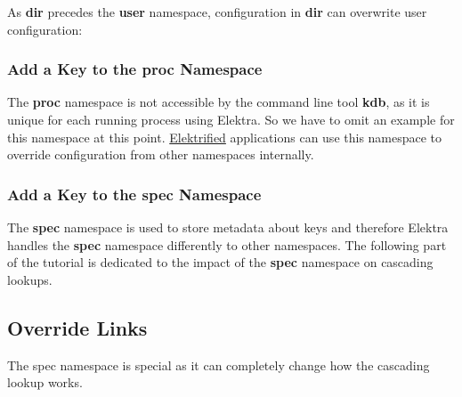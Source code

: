As {\bfseries dir} precedes the {\bfseries user} namespace, configuration in {\bfseries dir} can overwrite user configuration\+:




\subsubsection*{Add a Key to the proc Namespace}

The {\bfseries proc} namespace is not accessible by the command line tool {\bfseries kdb}, as it is unique for each running process using Elektra. So we have to omit an example for this namespace at this point. \hyperlink{md_doc_help_elektra-glossary_doc_help_elektra-glossary_md}{Elektrified} applications can use this namespace to override configuration from other namespaces internally.

\subsubsection*{Add a Key to the spec Namespace}

The {\bfseries spec} namespace is used to store metadata about keys and therefore Elektra handles the {\bfseries spec} namespace differently to other namespaces. The following part of the tutorial is dedicated to the impact of the {\bfseries spec} namespace on cascading lookups.

\subsection*{Override Links}

The {\ttfamily spec} namespace is special as it can completely change how the cascading lookup works.

